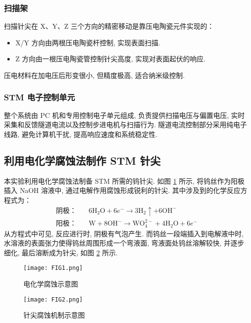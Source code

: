 \documentclass{whureport}
\begin{document}
\begin{multicols}{2}
\subsubsection{扫描架}
扫描针尖在 X、Y、Z 三个方向的精密移动是靠压电陶瓷元件实现的：
\begin{itemize}
    \item X/Y 方向由两根压电陶瓷杆控制, 实现表面扫描.
    \item Z 方向由一根压电陶瓷管控制针尖高度, 实现对表面起伏的响应.
\end{itemize}
压电材料在加电压后形变很小, 但精度极高, 适合纳米级控制.

\subsubsection{STM 电子控制单元}
整个系统由 PC 机和专用控制电子单元组成, 负责提供扫描电压与偏置电压, 实时采集和反馈隧道电流以及控制步进电机与扫描行为. 隧道电流控制部分采用纯电子线路, 避免计算机干扰, 提高响应速度和系统稳定性.

\subsection{利用电化学腐蚀法制作 STM 针尖}
本实验利用电化学腐蚀法制备 STM 所需的钨针尖. 如图 \ref{fig:etching_setup} 所示, 将钨丝作为阳极插入 NaOH 溶液中, 通过电解作用腐蚀形成锐利的针尖. 其中涉及到的化学反应方程式为：
\begin{align*} %
 \text{阴极：} \quad & 6\text{H}_2\text{O} + 6e^- \rightarrow 3\text{H}_2 \uparrow + 6\text{OH}^- \\
 \text{阳极：} \quad & \text{W} + 8\text{OH}^- \rightarrow \text{WO}_4^{2-} + 4\text{H}_2\text{O} + 6e^-
\end{align*}
从方程式中可见, 反应进行时, 阴极有气泡产生. 而钨丝一段端插入到电解液中时, 水溶液的表面张力使得钨丝周围形成一个弯液面, 弯液面处钨丝溶解较快, 并逐步细化, 最后溶断成为针尖, 如图 \ref{fig:etching_mechanism} 所示.

\begin{figure}[H] %
 \centering
 \texttt{[image: FIG1.png]} %
 \caption{电化学腐蚀示意图}
 \label{fig:etching_setup}
\end{figure}

\begin{figure}[H]
 \centering
 \texttt{[image: FIG2.png]} %
 \caption{针尖腐蚀机制示意图}
 \label{fig:etching_mechanism}
\end{figure}


\end{multicols}
\end{document}
